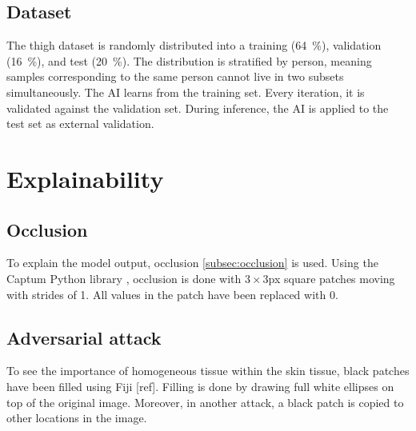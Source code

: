 \subsection{Dataset}\label{subsec:skin_dataset}
The thigh dataset is randomly distributed into a training (\qty{64}{\percent}), validation (\qty{16}{\percent}), and test (\qty{20}{\percent}).
The distribution is stratified by person, meaning samples corresponding to the same person cannot live in two subsets simultaneously.
The AI learns from the training set.
Every iteration, it is validated against the validation set.
During inference, the AI is applied to the test set as external validation.


\section{Explainability}

\subsection{Occlusion}
To explain the model output, occlusion \cref{subsec:occlusion} is used.
Using the Captum Python library \cite{Kokhlikyan2020}, occlusion is done with $3\times 3$\unit{px} square patches moving with strides of 1.
All values in the patch have been replaced with 0.

\subsection{Adversarial attack}
To see the importance of homogeneous tissue within the skin tissue, black patches have been filled using Fiji [ref].
Filling is done by drawing full white ellipses on top of the original image.
Moreover, in another attack, a black patch is copied to other locations in the image.
